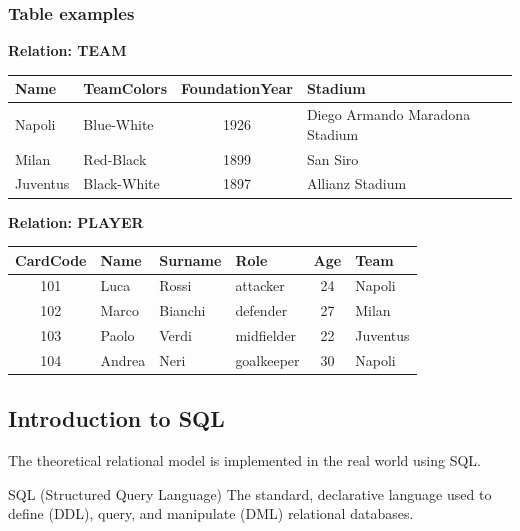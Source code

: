\subsubsection{Table examples}

\vspace{0.2cm}
\textbf{Relation: TEAM}

\vs
\begin{center}
\begin{tabular}{|l|l|c|l|}
\hline
\textbf{Name} & \textbf{TeamColors} & \textbf{FoundationYear} & \textbf{Stadium} \\
\hline
Napoli   & Blue-White   & 1926 & Diego Armando Maradona Stadium \\
Milan    & Red-Black    & 1899 & San Siro \\
Juventus & Black-White  & 1897 & Allianz Stadium \\
\hline
\end{tabular}
\end{center}

\vspace{0.3cm}
\textbf{Relation: PLAYER}

\vs
\begin{center}
\begin{tabular}{|c|l|l|l|c|l|}
\hline
\textbf{CardCode} & \textbf{Name} & \textbf{Surname} & \textbf{Role} & \textbf{Age} & \textbf{Team} \\
\hline
101 & Luca   & Rossi   & attacker    & 24 & Napoli   \\
102 & Marco  & Bianchi & defender    & 27 & Milan    \\
103 & Paolo  & Verdi   & midfielder  & 22 & Juventus \\
104 & Andrea & Neri    & goalkeeper  & 30 & Napoli   \\
\hline
\end{tabular}
\end{center}

\subsection{Introduction to SQL}
The theoretical relational model is implemented in the real world using SQL.

\begin{defbox}{SQL (Structured Query Language)}
The standard, declarative language used to define (DDL), query, and manipulate (DML) relational databases.
\end{defbox}

